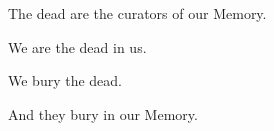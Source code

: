 \documentclass{article}
\begin{document}
\newline

The dead are the curators of our Memory.
\newline

We are the dead in us.
\newline

We bury the dead.
\newline

And they bury in our Memory.
\newline
\end{document}
